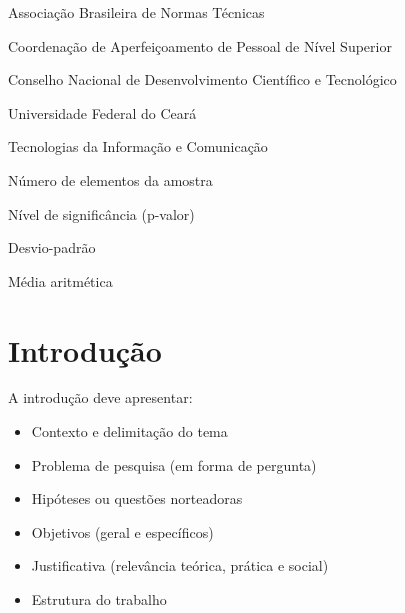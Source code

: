 \documentclass[
  12pt,
  openright,
  twoside,
  a4paper,
  brazilian
]{abntex2}
\begin{document}
\listoffigures*
\cleardoublepage

\listoftables*
\cleardoublepage

\begin{siglas}
  \item[ABNT] Associação Brasileira de Normas Técnicas
  \item[CAPES] Coordenação de Aperfeiçoamento de Pessoal de Nível Superior
  \item[CNPq] Conselho Nacional de Desenvolvimento Científico e Tecnológico
  \item[UFC] Universidade Federal do Ceará
  \item[TIC] Tecnologias da Informação e Comunicação
\end{siglas}

\begin{simbolos}
  \item[$n$] Número de elementos da amostra
  \item[$p$] Nível de significância (p-valor)
  \item[$\sigma$] Desvio-padrão
  \item[$\bar{x}$] Média aritmética
\end{simbolos}

\tableofcontents*
\cleardoublepage

\textual

\chapter[Introdução]{Introdução}

A introdução deve apresentar:
\begin{itemize}
  \item Contexto e delimitação do tema
  \item Problema de pesquisa (em forma de pergunta)
  \item Hipóteses ou questões norteadoras
  \item Objetivos (geral e específicos)
  \item Justificativa (relevância teórica, prática e social)
  \item Estrutura do trabalho
\end{itemize}
\end{document}
